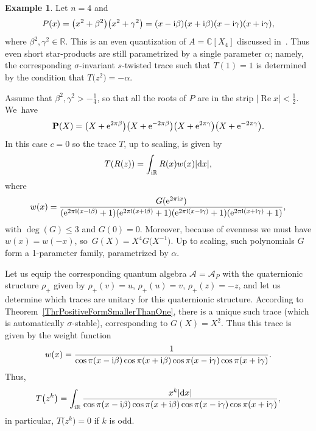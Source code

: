\documentclass[10pt,a4paper]{amsart}
\newcommand{\mc}[1]{\mathcal{#1}}
\renewcommand{\Re}{\operatorname{Re}}
\theoremstyle{definition}
\newtheorem{Example}[Theorem]{Example}
\numberwithin{equation}{section}
\begin{document}
\begin{Example}
Let $n=4$ and
\[
P(x)=\big(x^2+\beta^2\big)\big(x^2+\gamma^2\big)=(x-{\rm i}\beta )(x+{\rm i}\beta )(x-{\rm i}\gamma)(x+{\rm i}\gamma),
\]
where $\beta^2,\gamma^2\in \mathbb R$.
This is an even quantization of $A=\mathbb C[X_4]$ discussed in~\cite[Section~6.4]{BPR}. Thus even short star-products are still parametrized by a single parameter $\alpha$; namely, the corresponding $\sigma$-invariant $s$-twisted trace such that $T(1)=1$
is determined by the condition that $T\big(z^2\big)=-\alpha$.

Assume that $\beta^2,\gamma^2>-\frac{1}{4}$, so that all the roots of $P$ are in the strip $|\Re x|<\frac{1}{2}$. We~have
\[
\mathbf{P}(X)=\big(X+{\rm e}^{2\pi \beta}\big)\big(X+{\rm e}^{-2\pi \beta}\big)\big(X+{\rm e}^{2\pi \gamma}\big)\big(X+{\rm e}^{-2\pi \gamma}\big).
\]
In this case $c=0$ so the trace $T$, up to scaling, is given by
\[
T(R(z))=\int_{{\rm i}\mathbb R}R(x)w(x)|{\rm d}x|,
\]
where
\[
w(x)=\frac{G({\rm e}^{2\pi {\rm i}x})}{({\rm e}^{2\pi {\rm i}(x-{\rm i}\beta )}+1)({\rm e}^{2\pi {\rm i}(x+{\rm i}\beta )}+1)({\rm e}^{2\pi {\rm i}(x-{\rm i}\gamma)}+1)({\rm e}^{2\pi {\rm i}(x+{\rm i}\gamma)}+1)},
\]
with $\deg(G)\le 3$ and $G(0)=0$. Moreover, because of evenness we must have \mbox{$w(x)=w(-x)$}, so~$G(X)=X^4G\big(X^{-1}\big)$. Up to scaling, such polynomials $G$ form a 1-parameter family, para\-met\-ri\-zed by $\alpha$.

Let us equip the corresponding quantum algebra $\mc A=\mc A_P$ with the quaternionic structure $\rho_+$ given by $\rho_+(v)=u$, $\rho_+(u)=v$, $\rho_+(z)=-z$, and let us determine which traces are unitary
for this quaternionic structure. According to Theorem~\ref{ThrPositiveFormSmallerThanOne}, there is a unique
such trace (which is automatically $\sigma$-stable), corresponding to $G(X)=X^2$. Thus this trace is given by the weight function
\[
w(x)=\frac{1}{\cos \pi (x-{\rm i}\beta )\cos\pi(x+{\rm i}\beta )\cos \pi (x-{\rm i}\gamma)\cos\pi(x+{\rm i}\gamma)}.
\]
Thus,
\[
T\big(z^{k}\big)=\int_{{\rm i}\mathbb R}\frac{x^{k}|{\rm d}x|}{\cos \pi (x-{\rm i}\beta )\cos\pi(x+{\rm i}\beta )\cos \pi (x-{\rm i}\gamma)\cos\pi(x+{\rm i}\gamma)},
\]
in particular, $T\big(z^k\big)=0$ if $k$ is odd.


\end{Example}
\end{document}
